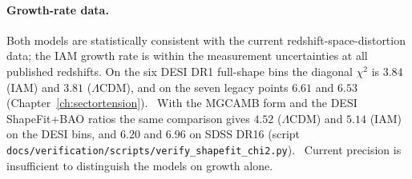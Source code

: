\begin{table}[htbp]\centering\small
\caption{Observational status of the cosmological virial partition. IAM values from the Level~2 chain and Eq.~\eqref{part2:eq:mu_virial} \calc; observed
values \observed.}\label{tab:vt_status}
\end{table}

\paragraph{Growth-rate data.} Both models are statistically consistent with the current redshift-space-distortion data; the IAM growth rate is within the
measurement uncertainties at all published redshifts. On the six DESI DR1 full-shape bins the diagonal $\chi^2$ is $3.84$ (IAM) and $3.81$ ($\Lambda$CDM), and on the seven
legacy points $6.61$ and $6.53$ (Chapter~\ref{ch:sectortension}). \calc\ With the MGCAMB form and the DESI ShapeFit+BAO ratios the same comparison gives
$4.52$ ($\Lambda$CDM) and $5.14$ (IAM) on the DESI bins, and $6.20$ and $6.96$ on SDSS DR16 (script \texttt{docs/\allowbreak{}verification/\allowbreak{}scripts/\allowbreak{}verify\_shapefit\_chi2.py}). \calc\ Current precision is insufficient to distinguish the models on growth alone.

